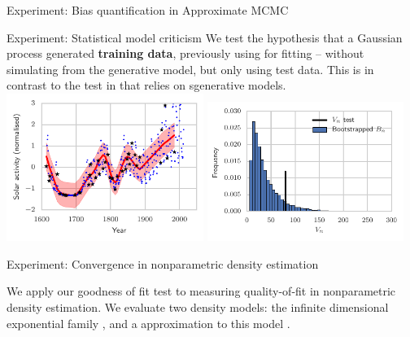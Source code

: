 \begin{frame}
\begin{columns}
\begin{column}{.32\linewidth}
\begin{block}{Experiment: Bias quantification in Approximate MCMC}
\end{block}
\vspace{-0.75cm}
\begin{block}{Experiment: Statistical model criticism}
We test the hypothesis that a Gaussian process generated \textbf{training data}, previously using for fitting -- without simulating from the generative model, but only using {\color{red} test data}. This is in contrast to the test in \cite{lloyd2015statistical} that relies on sgenerative models.
\includegraphics[width=0.48\textwidth]{../../presentation/img/gp_regression_data_fit.pdf} \includegraphics[width=0.48\textwidth]{../../presentation/img/gp_regression_bootstrap_hist} 
\begin{minipage}{.35\linewidth}

\end{minipage}
\end{block}

\vspace{-0.75cm}

\begin{block}{Experiment: Convergence in nonparametric density estimation}

 

We apply our goodness of fit test to measuring quality-of-fit in nonparametric density estimation. We evaluate two
density models: the infinite dimensional exponential family \cite{SriFukKumGreHyv14}, and a  approximation to this model \cite{strathmann2015gradient}.
% 


\end{block}
\end{column}
\end{columns}
\end{frame}
